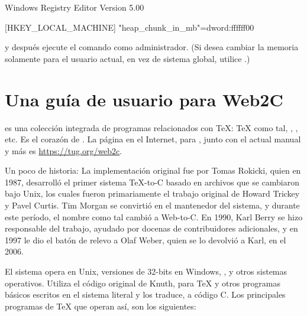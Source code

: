 \documentclass{article}
\begin{document}
\begin{sverbatim}
Windows Registry Editor Version 5.00

[HKEY_LOCAL_MACHINE\Software\Cygwin]
"heap_chunk_in_mb"=dword:ffffff00   
\end{sverbatim}

\noindent y después ejecute el comando  como
administrador. (Si desea cambiar la memoria solamente para el usuario
actual, en vez de sistema global, utilice .)

\section{Una guía de usuario para Web2C}

\Webc{} es una colección integrada de programas relacionados con \TeX{}:
\TeX{} como tal, \MP{}, \BibTeX{}, etc. Es el corazón de \TL{}. La
página en el Internet, para \Webc{}, junto con el actual manual y más es
\url{https://tug.org/web2c}.

Un poco de historia: La implementación original fue por Tomas Rokicki,
quien en 1987, desarrolló el primer sistema \TeX{}-to-C basado en archivos
que se cambiaron bajo Unix, los cuales fueron primariamente el trabajo
original de Howard Trickey y Pavel Curtis. Tim Morgan se convirtió en el
mantenedor del sistema, y durante este período, el nombre como tal cambió
a Web-to-C\@. En 1990, Karl Berry se hizo responsable del trabajo, ayudado
por docenas de contribuidores adicionales, y en 1997 le dio el batón de
relevo a Olaf Weber, quien se lo devolvió a Karl, en el 2006.

El sistema \Webc{} opera en Unix, versiones de 32-bits en Windows,
\macOS{}, y otros sistemas operativos. Utiliza el código original de
Knuth, para \TeX{} y otros programas básicos escritos en el sistema
literal \web{} y los traduce, a código C. Los principales programas de
\TeX{} que operan así, son los siguientes:
\end{document}
